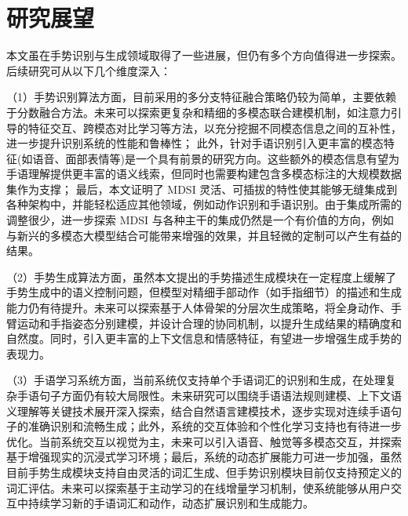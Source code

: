 \section{研究展望}
本文虽在手势识别与生成领域取得了一些进展，但仍有多个方向值得进一步探索。后续研究可从以下几个维度深入：

（1）手势识别算法方面，目前采用的多分支特征融合策略仍较为简单，主要依赖于分数融合方法。未来可以探索更复杂和精细的多模态联合建模机制，如注意力引导的特征交互、跨模态对比学习等方法，以充分挖掘不同模态信息之间的互补性，进一步提升识别系统的性能和鲁棒性；
此外，针对手语识别引入更丰富的模态特征(如语音、面部表情等)是一个具有前景的研究方向。这些额外的模态信息有望为手语理解提供更丰富的语义线索，但同时也需要构建包含多模态标注的大规模数据集作为支撑；
最后，本文证明了 MDSI 灵活、可插拔的特性使其能够无缝集成到各种架构中，并能轻松适应其他领域，例如动作识别和手语识别。由于集成所需的调整很少，进一步探索 MDSI 与各种主干的集成仍然是一个有价值的方向，例如与新兴的多模态大模型结合可能带来增强的效果，并且轻微的定制可以产生有益的结果。

（2）手势生成算法方面，虽然本文提出的手势描述生成模块在一定程度上缓解了手势生成中的语义控制问题，但模型对精细手部动作（如手指细节）的描述和生成能力仍有待提升。未来可以探索基于人体骨架的分层次生成策略，将全身动作、手臂运动和手指姿态分别建模，并设计合理的协同机制，以提升生成结果的精确度和自然度。同时，引入更丰富的上下文信息和情感特征，有望进一步增强生成手势的表现力。

（3）手语学习系统方面，当前系统仅支持单个手语词汇的识别和生成，在处理复杂手语句子方面仍有较大局限性。未来研究可以围绕手语语法规则建模、上下文语义理解等关键技术展开深入探索，结合自然语言建模技术，逐步实现对连续手语句子的准确识别和流畅生成；此外，系统的交互体验和个性化学习支持也有待进一步优化。当前系统交互以视觉为主，未来可以引入语音、触觉等多模态交互，并探索基于增强现实的沉浸式学习环境；最后，系统的动态扩展能力可进一步加强，虽然目前手势生成模块支持自由灵活的词汇生成、但手势识别模块目前仅支持预定义的词汇评估。未来可以探索基于主动学习的在线增量学习机制，使系统能够从用户交互中持续学习新的手语词汇和动作，动态扩展识别和生成能力。
